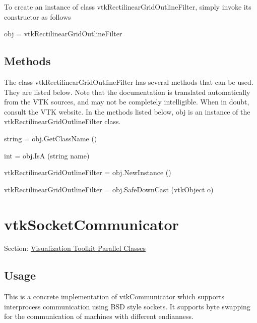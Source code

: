 To create an instance of class vtk\-Rectilinear\-Grid\-Outline\-Filter, simply invoke its constructor as follows \begin{DoxyVerb}  obj = vtkRectilinearGridOutlineFilter
\end{DoxyVerb}
 \hypertarget{vtkwidgets_vtkxyplotwidget_Methods}{}\subsection{Methods}\label{vtkwidgets_vtkxyplotwidget_Methods}
The class vtk\-Rectilinear\-Grid\-Outline\-Filter has several methods that can be used. They are listed below. Note that the documentation is translated automatically from the V\-T\-K sources, and may not be completely intelligible. When in doubt, consult the V\-T\-K website. In the methods listed below, {\ttfamily obj} is an instance of the vtk\-Rectilinear\-Grid\-Outline\-Filter class. 
\begin{DoxyItemize}
\item {\ttfamily string = obj.\-Get\-Class\-Name ()}  
\item {\ttfamily int = obj.\-Is\-A (string name)}  
\item {\ttfamily vtk\-Rectilinear\-Grid\-Outline\-Filter = obj.\-New\-Instance ()}  
\item {\ttfamily vtk\-Rectilinear\-Grid\-Outline\-Filter = obj.\-Safe\-Down\-Cast (vtk\-Object o)}  
\end{DoxyItemize}\hypertarget{vtkparallel_vtksocketcommunicator}{}\section{vtk\-Socket\-Communicator}\label{vtkparallel_vtksocketcommunicator}
Section\-: \hyperlink{sec_vtkparallel}{Visualization Toolkit Parallel Classes} \hypertarget{vtkwidgets_vtkxyplotwidget_Usage}{}\subsection{Usage}\label{vtkwidgets_vtkxyplotwidget_Usage}
This is a concrete implementation of vtk\-Communicator which supports interprocess communication using B\-S\-D style sockets. It supports byte swapping for the communication of machines with different endianness.

